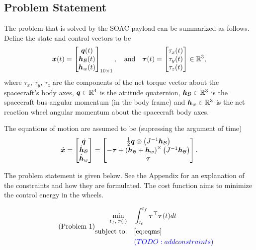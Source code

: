 \documentclass[10pt]{article}
\begin{document}
\subsection{Problem Statement}

The problem that is solved by the SOAC payload can be summarized as follows. Define the state and control vectors to be
\begin{equation}
\bm{x}(t) = \begin{bmatrix}
\bm{q}(t) \\ \bm{h}_{\mathcal{B}}(t) \\ \bm{h}_w(t)
\end{bmatrix}_{10\times 1}, \quad \text{and} \quad \bm{\tau}(t) = \begin{bmatrix}
\tau_x(t) \\ \tau_y(t) \\ \tau_z(t)
\end{bmatrix} \in {\mathbb{R}}^3,
\label{eq:state_control}
\end{equation}
where $\tau_x,\,\tau_y,\,\tau_z$ are the components of the net torque vector about the spacecraft's body axes, $\bm{q}\in{\mathbb{R}}^4$ is the attitude quaternion, $\bm{h}_{\mathcal{B}}\in{\mathbb{R}}^3$ is the spacecraft bus angular momentum (in the body frame) and $\bm{h}_w\in{\mathbb{R}}^3$ is the net reaction wheel angular momentum about the spacecraft body axes. 

The equations of motion are assumed to be (supressing the argument of time)
\begin{equation}
\dot{\bm{x}} = \begin{bmatrix}
\dot{\bm{q}} \\ \dot{\bm{h}}_{\mathcal{B}} \\ \dot{\bm{h}}_w
\end{bmatrix} = \begin{bmatrix}
\tfrac{1}{2} \bm{q} \otimes \left(J^{-1} \bm{h}_{\mathcal{B}} \right) \\
-\bm{\tau} + \left( \bm{h}_{\mathcal{B}} + \bm{h}_w \right)^{\times} \left( J^{-1} \bm{h}_{\mathcal{B}} \right) \\
\bm{\tau}
\end{bmatrix}.
\label{eq:eqms}
\end{equation}

The problem statement is given below. See the Appendix for an explanation of the constraints and how they are formulated. The cost function aims to minimize the control energy in the wheels.

\begin{equation}\tag{Problem 1}\label{prob:prob1}
\begin{alignedat}{1}
\min_{t_f,\,\bm{\tau}(\cdot)} &\quad \int_{t_0}^{t_f} \bm{\tau}^{\top}\bm{\tau}(t) dt \\
\text{subject to:} &\quad \eqref{eq:eqms} \\
&\quad {\color{blue}(TODO: add constraints)}
\end{alignedat}
\end{equation}
\end{document}

